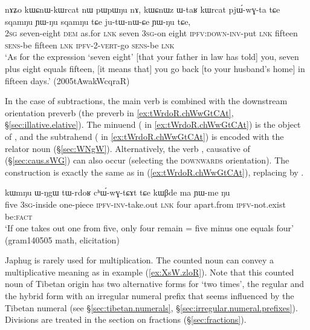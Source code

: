  

\begin{exe}
\ex \label{ex:kWrCat.pjWwGta}
\gll  nɤʑo kɯɕnɯ-kɯrcat nɯ pɯpɯŋu nɤ, kɯɕnɯz ɯ-taʁ kɯrcat pjɯ́-wɣ-ta tɕe sqamŋu ɲɯ-ŋu sqamŋu tɕe ju-tɯ-nɯ-ɕe ɲɯ-ŋu tɕe, \\
 \textsc{2sg} seven-eight \textsc{dem} as.for \textsc{lnk} seven  \textsc{3sg}-on eight \textsc{ipfv}:\textsc{down}-\textsc{inv}-put \textsc{lnk}  fifteen   \textsc{sens}-be fifteen \textsc{lnk} \textsc{ipfv}-2-\textsc{vert}-go \textsc{sens}-be \textsc{lnk} \\
\glt `As for the expression `seven eight' [that your father in law has told] you, seven plus eight equals fifteen, [it means that] you go back [to your husband's home] in fifteen days.' (2005tAwakWcqraR)
\end{exe}
  
 
In the case of subtractions, the  main verb is   combined with the downstream orientation preverb  (the preverb  in \ref{ex:tWrdoR.chWwGtCAt}, §\ref{sec:illative.elative}).  The minuend ( in \ref{ex:tWrdoR.chWwGtCAt}) is the object of , and the subtrahend  ( in \ref{ex:tWrdoR.chWwGtCAt}) is encoded with the relator noun  (§\ref{sec:WNgW}). Alternatively, the verb , causative of  (§\ref{sec:caus.sWG}) can also occur (selecting the \textsc{downwards} orientation). The construction is exactly the same as in (\ref{ex:tWrdoR.chWwGtCAt}), replacing   by  .

\begin{exe}
\ex \label{ex:tWrdoR.chWwGtCAt}
\gll kɯmŋu ɯ-ŋgɯ tɯ-rdoʁ cʰɯ́-wɣ-tɕɤt tɕe kɯβde ma ɲɯ-me ŋu \\
 five \textsc{3sg}-inside one-piece \textsc{ipfv}-\textsc{inv}-take.out \textsc{lnk} four apart.from \textsc{ipfv}-not.exist be:\textsc{fact} \\
\glt `If one takes out one from five, only four remain = five minus one equals four' (gram140505 math, elicitation)
\end{exe}

Japhug is rarely used for multiplication. The counted noun  can convey a multiplicative meaning  as in example (\ref{ex:XsW.zloR}). Note that this counted noun of Tibetan origin has two alternative forms for `two times', the regular   and the hybrid form  with an irregular numeral prefix that seems influenced by the Tibetan numeral  (see §\ref{sec:tibetan.numerals}, §\ref{sec:irregular.numeral.prefixes}). Divisions are treated in the section on fractions (§\ref{sec:fractions}).

